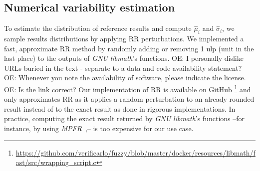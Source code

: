 \documentclass[lettersize,journal]{IEEEtran}
\newcommand{\oesteban}[1]{\color{orange}\textsc{OE:} #1\color{black}\xspace}
\newcommand{\fmriprep}{\emph{fMRIPrep}\xspace}
\begin{document}
\subsection{Numerical variability estimation}  %

To estimate the distribution of reference results and compute $\hat \mu_i$ and $\hat \sigma_i$,
  we sample results distributions by applying RR perturbations.
%
%
%
We implemented a fast, approximate RR method by randomly adding or removing 1 ulp (unit in the last place) 
  to the outputs of \emph{GNU libmath}'s functions.
\oesteban{I personally dislike URLs buried in the text - separate to a data and code availability statement?}
\oesteban{Whenever you note the availability of software, please indicate the license.}
\oesteban{Is the link correct?}
Our implementation of RR is available on GitHub%
  \footnote{\url{https://github.com/verificarlo/fuzzy/blob/master/docker/resources/libmath/fast/src/wrapping\_script.c}}
  and only approximates RR as it applies a random perturbation to an already rounded result
  instead of to the exact result as done in rigorous implementations.
In practice, computing the exact result returned by \emph{GNU libmath}'s functions
  --for instance, by using \emph{MPFR}~\cite{fousse2007mpfr},-- is too expensive for our use case.
\end{document}
